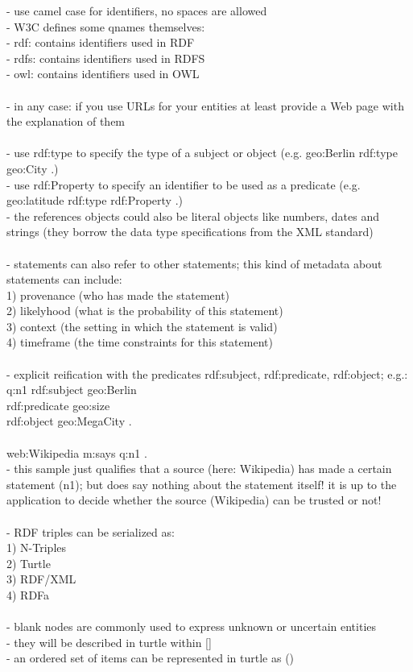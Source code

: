 - use camel case for identifiers, no spaces are allowed \\
- W3C defines some qnames themselves: \\
   - rdf: contains identifiers used in RDF \\
	 - rdfs: contains identifiers used in RDFS \\
	 - owl: contains identifiers used in OWL \\
\\
- in any case: if you use URLs for your entities at least provide a Web page with the explanation of them \\
\\
- use rdf:type to specify the type of a subject or object (e.g. geo:Berlin rdf:type geo:City .) \\
- use rdf:Property to specify an identifier to be used as a predicate (e.g. geo:latitude rdf:type rdf:Property .) \\
- the references objects could also be literal objects like numbers, dates and strings (they borrow the data type specifications from the XML standard)	\\
\\
- statements can also refer to other statements; this kind of metadata about statements can include: \\
  1) provenance (who has made the statement) \\
	2) likelyhood (what is the probability of this statement) \\
	3) context (the setting in which the statement is valid) \\
	4) timeframe (the time constraints for this statement) \\
\\
- explicit reification with the predicates rdf:subject, rdf:predicate, rdf:object; e.g.: \\
    q:n1 rdf:subject geo:Berlin \\
		     rdf:predicate geo:size \\
				 rdf:object geo:MegaCity . \\
\\
    web:Wikipedia m:says q:n1 .
\\
- this sample just qualifies that a source (here: Wikipedia) has made a certain statement (n1); but does say nothing about the
statement itself! it is up to the application to decide whether the source (Wikipedia) can be trusted or not! \\
\\
- RDF triples can be serialized as: \\
    1) N-Triples \\
		2) Turtle \\
		3) RDF/XML \\
		4) RDFa \\
\\
- blank nodes are commonly used to express unknown or uncertain entities \\
- they will be described in turtle within [] \\
- an ordered set of items can be represented in turtle as () \\
\\

